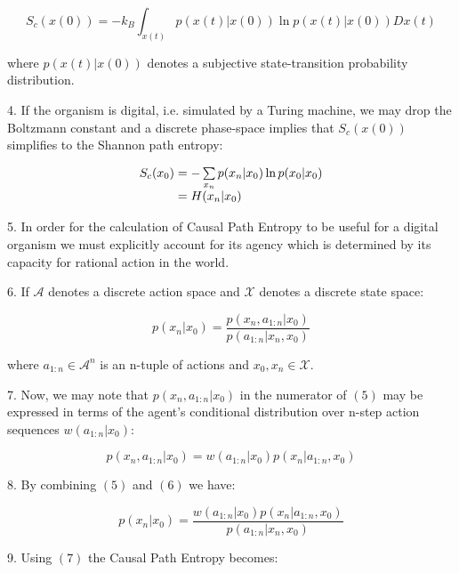 \documentclass{article}
\begin{document}
\begin{equation}
S_c(x(0))=-k_B \int_{x(t)} p(x(t)|x(0))\ln p(x(t)|x(0)) Dx(t)
\end{equation}

where $p(x(t)|x(0))$ denotes a subjective state-transition probability distribution.

\newpage

4. If the organism is digital, i.e. simulated by a Turing machine, we may drop the Boltzmann constant and a discrete phase-space implies that $S_c(x(0))$ simplifies to the Shannon path entropy:


\begin{equation}
\begin{array}{l@{}l}
S_c(x_0) 
    &{}= - \sum\limits_{x_n} p(x_n|x_0)\ln p(x_0|x_0) \\
    &{}= H(x_n|x_0) \\
\end{array}
\end{equation}

5. In order for the calculation of Causal Path Entropy to be useful for a digital organism we must explicitly account for its agency which is determined by its capacity for rational action in the world. 

6. If $\mathcal{A}$ denotes a discrete action space and $\mathcal{X}$ denotes a discrete state space:

\begin{equation}
p(x_n|x_0)= \frac{p(x_n,a_{1:n}|x_0)}{p(a_{1:n}|x_n,x_0)}
\end{equation}

where $a_{1:n} \in \mathcal{A}^n$ is an n-tuple of actions and $x_0,x_n \in \mathcal{X}$.

7. Now, we may note that $p(x_n,a_{1:n}|x_0)$ in the numerator of $(5)$ may be expressed in terms of the agent's conditional distribution over n-step action sequences $w(a_{1:n}|x_0)$:

\begin{equation}
p(x_n,a_{1:n}|x_0)= w(a_{1:n}|x_0)p(x_n|a_{1:n},x_0)
\end{equation}

8. By combining $(5)$ and $(6)$ we have:

\begin{equation}
p(x_n|x_0)= \frac{w(a_{1:n}|x_0)p(x_n|a_{1:n},x_0)}{p(a_{1:n}|x_n,x_0)}
\end{equation}

9. Using $(7)$ the Causal Path Entropy becomes:
\end{document}
